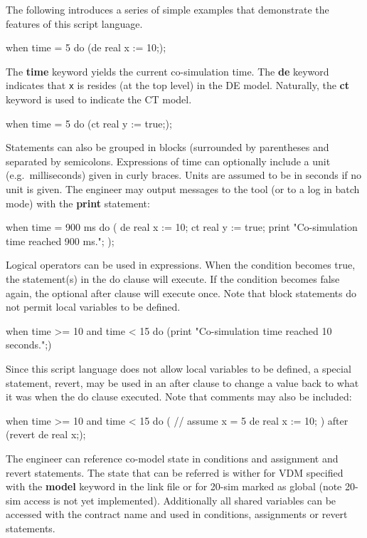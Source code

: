 \documentclass{crescendorepchap}
\newcommand{\vdmkeyw}[1]{{\bf\ttfamily #1}}
\begin{document}
The following introduces a series of simple examples that demonstrate
the features of this script language.

\begin{dcl}
when time = 5 do
  (de real x := 10;);
\end{dcl}

The \vdmkeyw{time} keyword yields the current co-simulation time. The \vdmkeyw{de}
keyword indicates that \texttt{x} is resides (at the top level) in the DE
model. Naturally, the \vdmkeyw{ct} keyword is used to indicate the CT model.

\begin{dcl}
when time = 5 do
  (ct real y := true;);
\end{dcl}

Statements can also be grouped in blocks (surrounded by parentheses and
separated by semicolons. Expressions of time can optionally include a
unit (e.g.\ milliseconds) given in curly braces. Units are assumed to be
in seconds if no unit is given. The engineer may output messages to the
tool (or to a log in batch mode) with the \vdmkeyw{print} statement:

\begin{dcl}
when time = 900 {ms} do
(
  de real x := 10;
  ct real y := true;
  print "Co-simulation time reached 900 ms.";
);
\end{dcl}

Logical operators can be used in expressions. When the condition becomes
true, the statement(s) in the do clause will execute. If the condition
becomes false again, the optional after clause will execute once. Note
that block statements do not permit local variables to be defined.~

\begin{dcl}
when time >= 10 and time < 15 do
  (print "Co-simulation time reached 10 seconds.";)
\end{dcl}

Since this script language does not allow local variables to be defined,
a special statement, revert, may be used in an after clause to change a
value back to what it was when the do clause executed.
Note that comments may also be included:

\begin{dcl}
when time >= 10 and time < 15 do 
(  // assume x = 5
 de real x := 10;
)
after (revert de real x;);
\end{dcl}

The engineer can reference co-model state in conditions and assignment
and revert statements. The state that can be referred is wither for VDM
specified with the \vdmkeyw{model} keyword in the link file or for 20-sim
marked as global (note 20-sim access is not yet implemented).
Additionally all shared variables can be accessed with the contract name
and used in conditions, assignments or revert statements.
\end{document}
